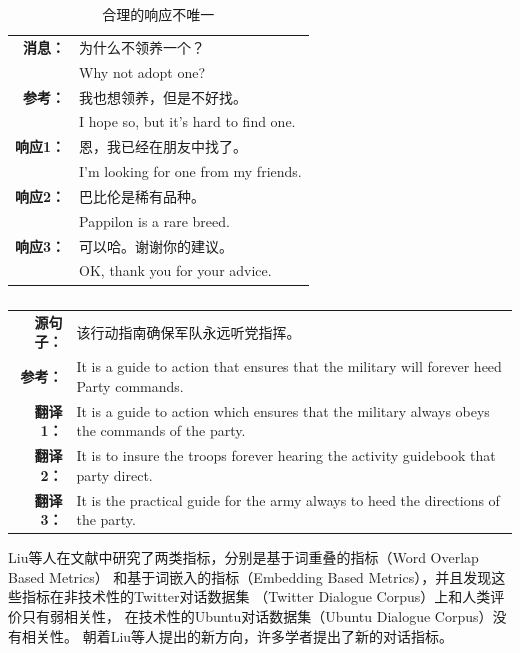 \begin{table}
    \centering
    \caption{合理的响应不唯一}
    \label{tab:multiple_valid_responses}
    \begin{tabular}{rl}
        \toprule
        \textbf{消息：} & 为什么不领养一个？ \\
        & Why not adopt one? \\
        \textbf{参考：} & 我也想领养，但是不好找。 \\
        & I hope so, but it's hard to find one. \\
        \midrule
        \textbf{响应1：} & 恩，我已经在朋友中找了。 \\
        & I'm looking for one from my friends. \\
        \textbf{响应2：} & 巴比伦是稀有品种。 \\
        & Pappilon is a rare breed. \\
        \textbf{响应3：} & 可以哈。谢谢你的建议。 \\
        & OK, thank you for your advice. \\
        \bottomrule
    \end{tabular}
\end{table}

\begin{table}
    \centering
    \caption{}
    \label{}
    \begin{tabular}{rl}
        \toprule
        \textbf{源句子：} & 该行动指南确保军队永远听党指挥。\\
        \textbf{参考：} & It is a guide to action that
        ensures that the military will forever
        heed Party commands. \\
        \midrule
        \textbf{翻译1：} & It is a guide to action which
        ensures that the military always obeys
        the commands of the party. \\
        \textbf{翻译2：} & It is to insure the troops
        forever hearing the activity guidebook
        that party direct. \\
        \textbf{翻译3：} & It is the practical guide for
        the army always to heed the directions
        of the party. \\
        \bottomrule
    \end{tabular}
\end{table}

Liu等人在文献\cite{HowNot}中研究了两类指标，分别是基于词重叠的指标（Word Overlap Based Metrics）
和基于词嵌入的指标（Embedding Based Metrics），并且发现这些指标在非技术性的Twitter对话数据集
（Twitter Dialogue Corpus）上和人类评价只有弱相关性，
在技术性的Ubuntu对话数据集（Ubuntu Dialogue Corpus）没有相关性。
朝着Liu等人提出的新方向，许多学者提出了新的对话指标。

